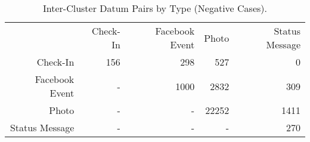 \begin{table}[htp]
	\begin{center}
	\caption{Inter-Cluster Datum Pairs by Type (Negative Cases).}
	\label{tab:ch6_table_inter_xtype_cluster}
		\begin{tabular}{r r r r r }
		\toprule
			 & Check-In & Facebook Event & Photo & Status Message\\
			Check-In & 156 & 298 & 527 & 0\\
			Facebook Event & - & 1000 & 2832 & 309\\
			Photo & - & - & 22252 & 1411\\
			Status Message & - & - & - & 270\\
		\bottomrule
		\end{tabular}
	\end{center}
\end{table}